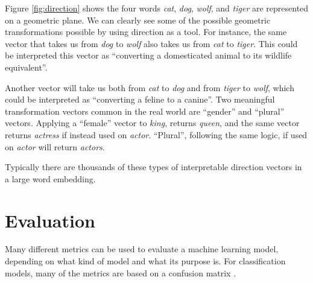 \documentclass[nofilelist]{cslthse-msc}
\begin{document}
Figure \ref{fig:direction} shows the four words \textit{cat}, \textit{dog}, \textit{wolf}, and \textit{tiger} are represented on a geometric plane. We can clearly see some of the possible geometric transformations possible by using direction as a tool. For instance, the same vector that takes us from \textit{dog} to \textit{wolf} also takes us from \textit{cat} to \textit{tiger}. This could be interpreted this vector as ``converting a domesticated animal to its wildlife equivalent''. 

Another vector will take us both from \textit{cat} to \textit{dog} and from \textit{tiger} to \textit{wolf}, which could be interpreted as ``converting a feline to a canine''. Two meaningful transformation vectors common in the real world are ``gender'' and ``plural'' vectors. Applying a ``female'' vector to \textit{king}, returns \textit{queen}, and the same vector returns \textit{actress} if instead used on \textit{actor}. ``Plural'', following the same logic, if used on \textit{actor} will return \textit{actors}. 

Typically there are thousands of these types of interpretable direction vectors in a large word embedding.











\section{Evaluation}
Many different metrics can be used to evaluate a machine learning model, depending on what kind of model and what its purpose is. For classification models, many of the metrics are based on a confusion matrix \citep{FAWCETT2006861}. 
\end{document}
